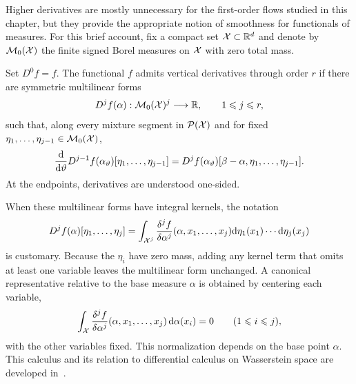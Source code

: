 Higher derivatives are mostly unnecessary
 for the first-order flows studied in this chapter, but they provide the appropriate notion of smoothness for functionals of measures. For this brief account, fix a compact set \(\mathcal{X}\subset\mathbb{R}^d\) and denote by \(\mathcal{M}_0(\mathcal{X})\) the finite signed Borel measures on \(\mathcal{X}\) with zero total mass.
\begin{defn}\label{def-higher-order-vertical-derivatives}
	Set \(D^0f=f\). The functional \(f\) admits vertical derivatives through order \(r\) if there are symmetric multilinear forms
	\[
		D^j f(\alpha):\mathcal{M}_0(\mathcal{X})^j\longrightarrow\mathbb{R},
		\qquad 1\leqslant j\leqslant r,
	\]
	such that, along every mixture segment in \(\mathcal{P}(\mathcal{X})\) and for fixed \(\eta_1,\ldots,\eta_{j-1}\in\mathcal{M}_0(\mathcal{X})\),
	\[
		\frac{\mathrm{d}}{\mathrm{d}\vartheta}
		D^{j-1}f(\alpha_\vartheta)[\eta_1,\ldots,\eta_{j-1}]
		=
		D^j f(\alpha_\vartheta)
		[\beta-\alpha,\eta_1,\ldots,\eta_{j-1}].
	\]
	At the endpoints, derivatives are understood one-sided.
\end{defn}
When these multilinear forms have integral kernels, the notation
\[
	D^j f(\alpha)[\eta_1,\ldots,\eta_j]
	=
	\int_{\mathcal{X}^j}
	\frac{\delta^j f}{\delta\alpha^j}
	(\alpha,x_1,\ldots,x_j)
	\mathrm{d}\eta_1(x_1)\cdots\mathrm{d}\eta_j(x_j)
\]
is customary. Because the \(\eta_i\) have zero mass, adding any kernel term that omits at least one variable leaves the multilinear form unchanged. A canonical representative relative to the base measure \(\alpha\) is obtained by centering each variable,
\[
	\int_{\mathcal{X}}
	\frac{\delta^j f}{\delta\alpha^j}
	(\alpha,x_1,\ldots,x_j)\,\mathrm{d}\alpha(x_i)=0
	\qquad (1\leqslant i\leqslant j),
\]
with the other variables fixed. This normalization depends on the base point \(\alpha\). This calculus and its relation to differential calculus on Wasserstein space are developed in~\cite{CarmonaDelarue2018,ChassagneuxSzpruchTse2022}.


